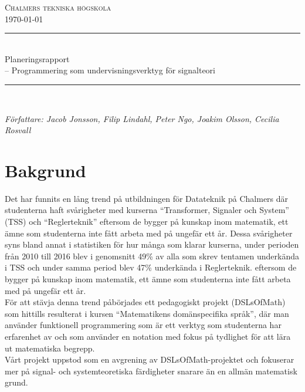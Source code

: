 \documentclass{article}
\begin{document}
\begin{titlepage} \newcommand{\HRule}{\rule{\linewidth}{0.3mm}} 
\center 
\textsc{\Large Chalmers tekniska högskola}\\[0.05cm] %
\normalsize \today

\HRule \\[0.08cm] 
{ \large Planeringsrapport \\ \normalsize{-- Programmering som undervisningsverktyg för signalteori}}\\[0.08cm] 
\HRule \\[0.3cm] 

\begin{minipage}{0.5\textwidth} 
\begin{flushleft} \small 
\emph{Författare: Jacob Jonsson, Filip Lindahl, Peter Ngo, Joakim Olsson, Cecilia Rosvall}
\end{flushleft} 

\end{minipage}


\end{titlepage}
\newpage
\tableofcontents
\newpage




\section{Bakgrund}
Det har funnits en lång trend på utbildningen för Datateknik på Chalmers där studenterna haft svårigheter med kurserna “Transformer, Signaler och System” (TSS) och “Reglerteknik” 
eftersom de bygger på kunskap inom matematik, ett ämne som studenterna inte fått arbeta med på ungefär ett år. Dessa svårigheter syns bland annat i statistiken för hur många som klarar kurserna, under perioden från 2010 till 2016 blev i genomsnitt 49\% av alla som skrev tentamen underkända i TSS och under samma period blev 47\% underkända i Reglerteknik.
eftersom de bygger på kunskap inom matematik, ett ämne som studenterna inte fått arbeta med på ungefär ett år.\\
\newline
För att stävja denna trend påbörjades ett pedagogiskt projekt (DSLsOfMath) som hittills resulterat i kursen “Matematikens domänspecifika språk”, där man använder funktionell programmering som är ett verktyg som studenterna har erfarenhet av och som använder en notation med fokus på tydlighet för att lära ut matematiska begrepp.\\
\newline
Vårt projekt uppstod som en avgrening av DSLsOfMath-projektet och fokuserar mer på signal- och systemteoretiska färdigheter snarare än en allmän matematisk grund.
\end{document}
